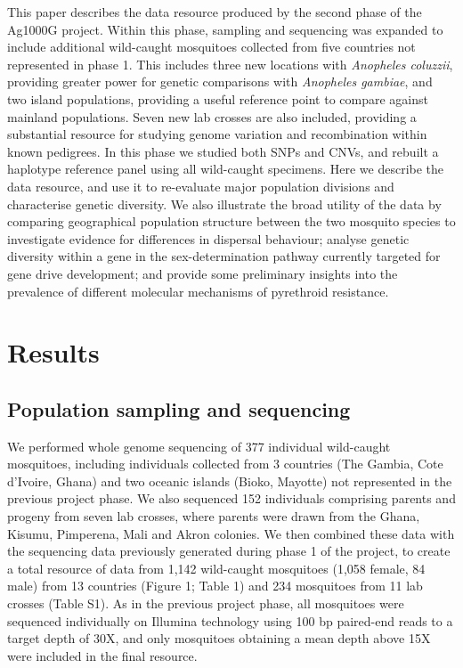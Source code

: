 \documentclass[a4paper,11pt,abstracton,hidelinks]{scrartcl}
\begin{document}
%
This paper describes the data resource produced by the second phase of the Ag1000G project.
%
Within this phase, sampling and sequencing was expanded to include additional wild-caught mosquitoes collected from five countries not represented in phase 1.
%
This includes three new locations with \textit{Anopheles coluzzii}, providing greater power for genetic comparisons with \textit{Anopheles gambiae}, and two island populations, providing a useful reference point to compare against mainland populations.
%
Seven new lab crosses are also included, providing a substantial resource for studying genome variation and recombination within known pedigrees.
%
In this phase we studied both SNPs and CNVs, and rebuilt a haplotype reference panel using all wild-caught specimens.
%
Here we describe the data resource, and use it to re-evaluate major population divisions and characterise genetic diversity.
%
We also illustrate the broad utility of the data by comparing geographical population structure between the two mosquito species to investigate evidence for differences in dispersal behaviour; analyse genetic diversity within a gene in the sex-determination pathway currently targeted for gene drive development; and provide some preliminary insights into the prevalence of different molecular mechanisms of pyrethroid resistance.


\section*{Results}


\subsection*{Population sampling and sequencing}


%
We performed whole genome sequencing of 377 individual wild-caught mosquitoes, including individuals collected from 3 countries (The Gambia, Cote d'Ivoire, Ghana) and two oceanic islands (Bioko, Mayotte) not represented in the previous project phase. 
%
We also sequenced 152 individuals comprising parents and progeny from seven lab crosses, where parents were drawn from the Ghana, Kisumu, Pimperena, Mali and Akron colonies. 
%
We then combined these data with the sequencing data previously generated during phase 1 of the project, to create a total resource of data from 1,142 wild-caught mosquitoes (1,058 female, 84 male) from 13 countries (Figure 1; Table 1) and 234 mosquitoes from 11 lab crosses (Table S1). 
%
As in the previous project phase, all mosquitoes were sequenced individually on Illumina technology using 100 bp paired-end reads to a target depth of 30X, and only mosquitoes obtaining a mean depth above 15X were included in the final resource. 
\end{document}
